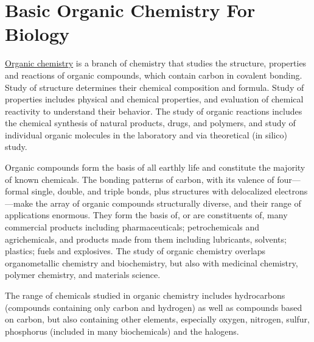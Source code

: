 \hypertarget{basic-organic-chemistry-for-biology}{%
\section{Basic Organic Chemistry For
Biology}\label{basic-organic-chemistry-for-biology}}

\href{https://en.wikipedia.org/wiki/Organic_chemistry}{Organic
chemistry} is a branch of chemistry that studies the structure,
properties and reactions of organic compounds, which contain carbon in
covalent bonding. Study of structure determines their chemical
composition and formula. Study of properties includes physical and
chemical properties, and evaluation of chemical reactivity to understand
their behavior. The study of organic reactions includes the chemical
synthesis of natural products, drugs, and polymers, and study of
individual organic molecules in the laboratory and via theoretical (in
silico) study.

Organic compounds form the basis of all earthly life and constitute the
majority of known chemicals. The bonding patterns of carbon, with its
valence of four---formal single, double, and triple bonds, plus
structures with delocalized electrons---make the array of organic
compounds structurally diverse, and their range of applications
enormous. They form the basis of, or are constituents of, many
commercial products including pharmaceuticals; petrochemicals and
agrichemicals, and products made from them including lubricants,
solvents; plastics; fuels and explosives. The study of organic chemistry
overlaps organometallic chemistry and biochemistry, but also with
medicinal chemistry, polymer chemistry, and materials science.

The range of chemicals studied in organic chemistry includes
hydrocarbons (compounds containing only carbon and hydrogen) as well as
compounds based on carbon, but also containing other elements,
especially oxygen, nitrogen, sulfur, phosphorus (included in many
biochemicals) and the halogens.

